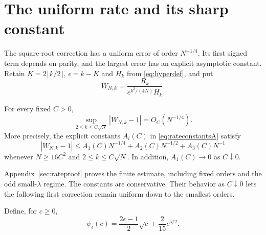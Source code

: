 \section{The uniform rate and its sharp constant}\label{sec:rates}

The square-root correction has a uniform error of order $N^{-1/4}$. Its first signed term depends on parity, and the largest error has an explicit asymptotic constant. Retain $K=2\lfloor k/2\rfloor$, $\epsilon=k-K$ and $H_k$ from \eqref{eq:hyperdef}, and put
\begin{equation}\label{eq:rateW}
W_{N,k}=\frac{R_k}{e^{k^2/(4N)}H_k}.
\end{equation}

\begin{theorem}\label{thm:rate}
For every fixed $C>0$,
\begin{equation}\label{eq:uniformrate}
\sup_{2\le k\le C\sqrt N}|W_{N,k}-1|=O_C(N^{-1/4}).
\end{equation}
More precisely, the explicit constants $A_i(C)$ in \eqref{eq:rateconstantsA} satisfy
\begin{equation}\label{eq:ratefinite}
|W_{N,k}-1|
\le A_1(C)N^{-1/4}+A_2(C)N^{-1/2}+A_3(C)N^{-1}
\end{equation}
whenever $N\ge16C^2$ and $2\le k\le C\sqrt N$. In addition, $A_1(C)\to0$ as $C\downarrow0$.
\end{theorem}

Appendix~\ref{sec:rateproof} proves the finite estimate, including fixed orders and the odd small-$\lambda$ regime. The constants are conservative. Their behavior as $C\downarrow0$ lets the following first correction remain uniform down to the smallest orders.

Define, for $c\ge0$,
\begin{equation}\label{eq:ratepsi}
\psi_\epsilon(c)=\frac{2\epsilon-1}{2}\sqrt c+\frac{2}{15}c^{5/2}.
\end{equation}

